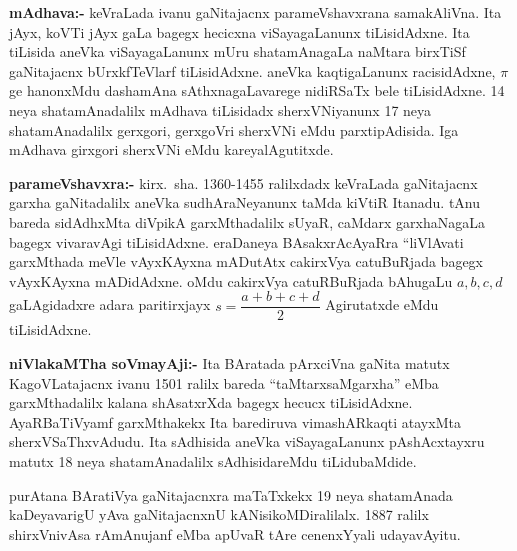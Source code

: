 \textbf{mAdhava:-} keVraLada ivanu gaNitajacnx parameVshavxrana samakAliVna. Ita jAyx, koVTi jAyx gaLa bagegx hecicxna viSayagaLanunx tiLisidAdxne. Ita tiLisida aneVka viSayagaLanunx mUru shatamAnagaLa naMtara birxTiSf gaNitajacnx bUrxkfTeVlarf tiLisidAdxne. aneVka kaqtigaLanunx racisidAdxne, $\pi$ ge hanonxMdu dashamAna sAthxnagaLavarege nidiRSaTx bele tiLisidAdxne. {\rm 14} neya shatamAnadalilx mAdhava tiLisidadx sherxVNiyanunx {\rm 17} neya shatamAnadalilx gerxgori, gerxgoVri sherxVNi eMdu parxtipAdisida. Iga mAdhava girxgori sherxVNi eMdu kareyalAgutitxde.

\textbf{parameVshavxra:-} kirx.~sha. {\rm 1360-1455} ralilxdadx keVraLada gaNitajacnx garxha gaNitadalilx aneVka sudhAraNeyanunx taMda kiVtiR Itanadu. tAnu bareda sidAdhxMta diVpikA garxMthadalilx sUyaR, caMdarx garxhaNagaLa bagegx vivaravAgi tiLisidAdxne. eraDaneya BAsakxrAcAyaRra ``liVlAvati garxMthada meVle vAyxKAyxna mADutAtx cakirxVya catuBuRjada bagegx vAyxKAyxna mADidAdxne. oMdu cakirxVya catuRBuRjada bAhugaLu $a, b, c, d$ gaLAgidadxre adara paritirxjayx $s=\dfrac{a+b+c+d}{2}$ Agirutatxde eMdu tiLisidAdxne. 

\textbf{niVlakaMTha soVmayAji:-} Ita BAratada pArxciVna gaNita matutx KagoVLatajacnx ivanu {\rm 1501} ralilx bareda ``taMtarxsaMgarxha'' eMba garxMthadalilx kalana shAsatxrXda bagegx hecucx tiLisidAdxne. AyaRBaTiVyamf garxMthakekx Ita barediruva vimashARkaqti atayxMta sherxVSaThxvAdudu. Ita sAdhisida aneVka viSayagaLanunx pAshAcxtayxru matutx {\rm 18} neya shatamAnadalilx sAdhisidareMdu tiLidubaMdide.

purAtana BAratiVya gaNitajacnxra maTaTxkekx {\rm 19} neya shatamAnada kaDeyavarigU yAva gaNitajacnxnU kANisikoMDiralilalx. {\rm 1887} ralilx shirxVnivAsa rAmAnujanf eMba apUvaR tAre cenenxYyali udayavAyitu. 
